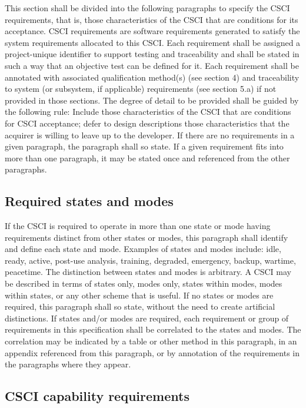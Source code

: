 This section shall be divided into the following paragraphs to specify
the CSCI requirements, that is, those characteristics of the CSCI that
are conditions for its acceptance. CSCI requirements are software
requirements generated to satisfy the system requirements allocated to
this CSCI. Each requirement shall be assigned a project-unique
identifier to support testing and traceability and shall be stated in
such a way that an objective test can be defined for it. Each
requirement shall be annotated with associated qualification method(s)
(see section 4) and traceability to system (or subsystem, if applicable)
requirements (see section 5.a) if not provided in those sections. The
degree of detail to be provided shall be guided by the following rule:
Include those characteristics of the CSCI that are conditions for CSCI
acceptance; defer to design descriptions those characteristics that the
acquirer is willing to leave up to the developer. If there are no
requirements in a given paragraph, the paragraph shall so state. If a
given requirement fits into more than one paragraph, it may be stated
once and referenced from the other paragraphs.

\subsection{Required states and modes}

If the CSCI is required to operate in more than one state or mode having
requirements distinct from other states or modes, this paragraph shall
identify and define each state and mode. Examples of states and modes
include: idle, ready, active, post-use analysis, training, degraded,
emergency, backup, wartime, peacetime. The distinction between states
and modes is arbitrary. A CSCI may be described in terms of states only,
modes only, states within modes, modes within states, or any other
scheme that is useful. If no states or modes are required, this
paragraph shall so state, without the need to create artificial
distinctions. If states and/or modes are required, each requirement or
group of requirements in this specification shall be correlated to the
states and modes. The correlation may be indicated by a table or other
method in this paragraph, in an appendix referenced from this paragraph,
or by annotation of the requirements in the paragraphs where they
appear.

\subsection{CSCI capability requirements}

